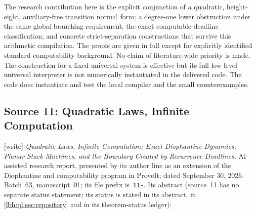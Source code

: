 \documentclass[11pt,letterpaper]{article}
\theoremstyle{definition}
\theoremstyle{remark}
\newcommand{\1}{\mathbf 1}
\newcommand{\repo}{\textsf{ProveIt}}
\newcommand{\wtag}{\textup{[write]}}%
\begin{document}
The research contribution here is the explicit conjunction of a quadratic,
height-eight, auxiliary-free transition normal form; a degree-one lower
obstruction under the same global branching requirement; the exact
computable-deadline classification; and concrete strict-separation
constructions that survive this arithmetic compilation. The proofs are given
in full except for explicitly identified standard computability background.
No claim of literature-wide priority is made. The construction for a fixed
universal system is effective but its full low-level universal interpreter is
not numerically instantiated in the delivered code. The code does instantiate
and test the local compiler and the small counterexamples.
\subsection{Source 11: Quadratic Laws, Infinite Computation}\label{lbh:sec:ms11}
\wtag{} \emph{Quadratic Laws, Infinite Computation: Exact Diophantine Dynamics, Planar Stack
Machines, and the Boundary Created by Recurrence Deadlines.} AI-assisted research report,
presented by its author line as an extension of the Diophantine and computability program in
\repo; dated September 30, 2026. Batch~63, manuscript~01; its file prefix is~\texttt{11-}. Its
abstract (source~11 has no separate status statement; its status is stated in its abstract, in
\cref{lbh:ql:sec:repository} and in its theorem-status ledger):
\end{document}
